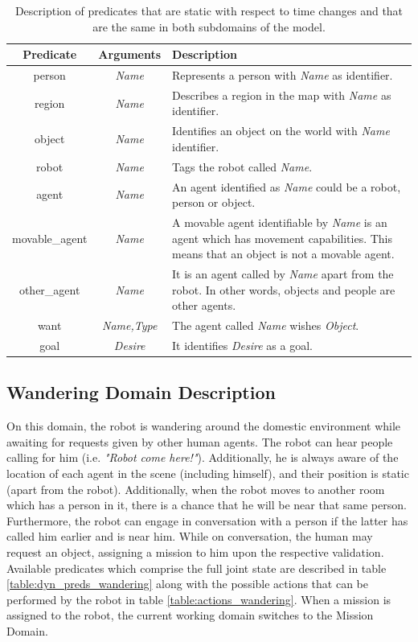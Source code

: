\begin{table}[H]
    \begin{tabularx}{\textwidth}{ |c|c|X| }
     \hline
     Predicate & Arguments & Description\\
     \hline
     person   &   \textit{Name}  &  Represents a person with \textit{Name} as
     identifier.\\
     region &   \textit{Name}   & Describes a region in the map with
     \textit{Name} as identifier.\\
     object &   \textit{Name}   & Identifies an object on the world with
     \textit{Name} identifier.\\
     robot  &   \textit{Name}   &   Tags the robot called \textit{Name}.\\
     agent &    \textit{Name}   &   An agent identified as \textit{Name} could
     be a robot, person or object.\\
     movable\_agent &   \textit{Name}   &   A movable agent identifiable by
     \textit{Name} is an agent which has movement capabilities. This means that
     an object is not a movable agent.\\
     other\_agent   &   \textit{Name}   &   It is an agent called by
     \textit{Name} apart from the robot. In other words, objects and people are
     other agents.\\
     want   &   \textit{Name,Type}  &   The agent called \textit{Name} wishes
     \textit{Object}.\\
     goal   &   \textit{Desire} & It identifies \textit{Desire} as a goal.\\
     \hline
    \end{tabularx}
    \caption{Description of predicates that are static with respect to time
    changes and that are the same in both subdomains of the model.}
    \label{table:static_predicates}
\end{table}

\subsection{Wandering Domain Description}

On this domain, the robot is wandering around the domestic environment while 
awaiting for requests given by other human agents. The robot can hear people 
calling for him (i.e. \textit{"Robot come here!"}). Additionally, he is always aware 
of the location of each agent in the scene (including himself), and their position is static (apart from
the robot). Additionally, when the 
robot moves to another room which has a person in it, there is a chance that he will be near 
that same person. 
Furthermore, the robot can engage in conversation with a person if the latter has called him earlier 
and is near him. 
While on conversation, the human may request an object, assigning a mission to him upon
the respective validation. Available predicates which comprise the full joint state are 
described in table \ref{table:dyn_preds_wandering} along with the possible actions that 
can be performed by the robot in table \ref{table:actions_wandering}. When a mission is
assigned to the robot, the current working domain switches to the Mission Domain.

